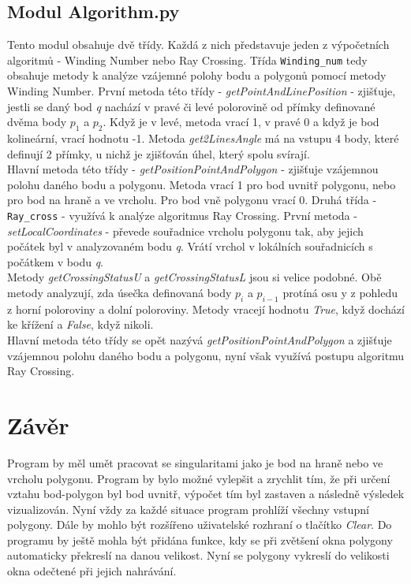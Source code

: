\documentclass{article}
\begin{document}
\subsection{\small{Modul Algorithm.py}}
Tento modul obsahuje dvě třídy. Každá z nich představuje jeden z výpočetních algoritmů - Winding Number nebo Ray Crossing. Třída \texttt{Winding\_num} tedy obsahuje metody k analýze vzájemné polohy bodu a polygonů pomocí metody Winding Number. První metoda této třídy - \emph{getPointAndLinePosition} - zjišťuje, jestli se daný bod \emph{q} nachází v pravé či levé polorovině od přímky definované dvěma body $p_{1}$ a $p_{2}$. Když je v levé, metoda vrací 1, v pravé 0 a když je bod kolineární, vrací hodnotu -1. Metoda \emph{get2LinesAngle} má na vstupu 4 body, které definují 2 přímky, u nichž je zjišťován úhel, který spolu svírají.\\
Hlavní metoda této třídy - \emph{getPositionPointAndPolygon} - zjišťuje vzájemnou polohu daného bodu a polygonu. Metoda vrací 1 pro bod uvnitř polygonu, nebo pro bod na hraně a ve vrcholu. Pro bod vně polygonu vrací 0.
Druhá třída  - \texttt{Ray\_cross} - využívá k analýze algoritmus Ray Crossing. První metoda - \emph{setLocalCoordinates} - převede souřadnice vrcholu polygonu tak, aby jejich počátek byl v analyzovaném bodu \emph{q}. Vrátí vrchol v lokálních souřadnicích s počátkem v bodu \emph{q}.\\
Metody \emph{getCrossingStatusU} a \emph{getCrossingStatusL} jsou si velice podobné. Obě metody analyzují, zda úsečka definovaná body $p_{i}$ a $p_{i-1}$ protíná osu y z pohledu z horní poloroviny a dolní poloroviny. Metody vracejí hodnotu \emph{True}, když dochází ke křížení a \emph{False}, když nikoli.\\
Hlavní metoda této třídy se opět nazývá \emph{getPositionPointAndPolygon} a zjišťuje vzájemnou polohu daného bodu a polygonu, nyní však využívá postupu algoritmu Ray Crossing.
\clearpage
\newpage
\section{\large{Závěr}}
Program by měl umět pracovat se singularitami jako je bod na hraně nebo ve vrcholu polygonu. Program by bylo možné vylepšit a zrychlit tím, že při určení vztahu bod-polygon byl bod uvnitř, výpočet tím byl zastaven a následně výsledek vizualizován. Nyní vždy za každé situace program prohlíží všechny vstupní polygony. Dále by mohlo být rozšířeno uživatelské rozhraní o tlačítko \emph{Clear}. Do programu by ještě mohla být přidána funkce, kdy se při zvětšení okna polygony automaticky překreslí na danou velikost. Nyní se polygony vykreslí do velikosti okna odečtené při jejich nahrávání.
\clearpage
\newpage
\end{document}
